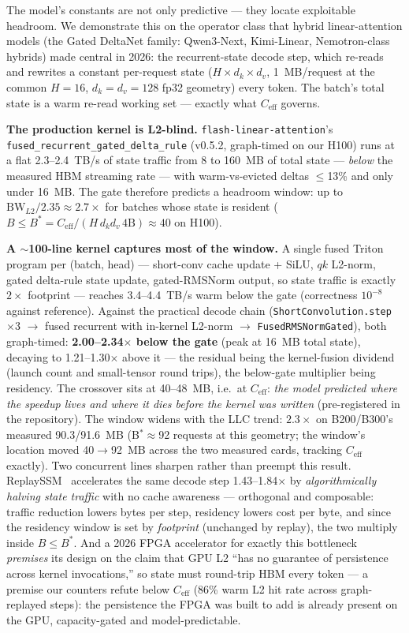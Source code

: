 \documentclass[10pt,twocolumn]{article}
\begin{document}
The model's constants are not only predictive --- they locate exploitable headroom.  We demonstrate this on the operator class that hybrid linear-attention models (the Gated DeltaNet family: Qwen3-Next, Kimi-Linear, Nemotron-class hybrids) made central in 2026: the recurrent-state decode step, which re-reads and rewrites a constant per-request state ($H \times d_k \times d_v$, 1~MB/request at the common $H{=}16$, $d_k{=}d_v{=}128$ fp32 geometry) every token.  The batch's total state is a warm re-read working set --- exactly what $C_\text{eff}$ governs.

\textbf{The production kernel is L2-blind.}  \texttt{flash-linear-attention}'s \texttt{fused\_recurrent\_gated\_delta\_rule} (v0.5.2, graph-timed on our H100) runs at a flat 2.3--2.4~TB/s of state traffic from 8 to 160~MB of total state --- \emph{below} the measured HBM streaming rate --- with warm-vs-evicted deltas $\leq$13\% and only under 16~MB.  The gate therefore predicts a headroom window: up to $\mathrm{BW}_{L2}/2.35 \approx 2.7\times$ for batches whose state is resident ($B \leq B^* = C_\text{eff}/(H\,d_k d_v\,4\mathrm{B}) \approx 40$ on H100).

\textbf{A $\sim$100-line kernel captures most of the window.}  A single fused Triton program per (batch, head) --- short-conv cache update + SiLU, $qk$ L2-norm, gated delta-rule state update, gated-RMSNorm output, so state traffic is exactly $2\times$ footprint --- reaches 3.4--4.4~TB/s warm below the gate (correctness $10^{-8}$ against reference).  Against the practical decode chain (\texttt{ShortConvolution.step} $\times 3$ $\to$ fused recurrent with in-kernel L2-norm $\to$ \texttt{FusedRMSNormGated}), both graph-timed: \textbf{2.00--2.34$\times$ below the gate} (peak at 16~MB total state), decaying to 1.21--1.30$\times$ above it --- the residual being the kernel-fusion dividend (launch count and small-tensor round trips), the below-gate multiplier being residency.  The crossover sits at 40--48~MB, i.e.\ at $C_\text{eff}$: \emph{the model predicted where the speedup lives and where it dies before the kernel was written} (pre-registered in the repository).  The window widens with the LLC trend: $2.3\times$ on B200/B300's measured 90.3/91.6~MB (B$^*\approx$92 requests at this geometry; the window's location moved 40$\to$92~MB across the two measured cards, tracking $C_\text{eff}$ exactly).  Two concurrent lines sharpen rather than preempt this result.  ReplaySSM~\cite{dao2026replayssm} accelerates the same decode step 1.43--1.84$\times$ by \emph{algorithmically halving state traffic} with no cache awareness --- orthogonal and composable: traffic reduction lowers bytes per step, residency lowers cost per byte, and since the residency window is set by \emph{footprint} (unchanged by replay), the two multiply inside $B \leq B^*$.  And a 2026 FPGA accelerator for exactly this bottleneck~\cite{gupta2026persistentstate} \emph{premises} its design on the claim that GPU L2 ``has no guarantee of persistence across kernel invocations,'' so state must round-trip HBM every token --- a premise our counters refute below $C_\text{eff}$ (86\% warm L2 hit rate across graph-replayed steps): the persistence the FPGA was built to add is already present on the GPU, capacity-gated and model-predictable.
\end{document}
